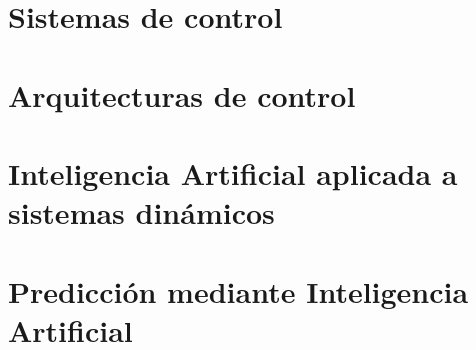 \documentclass[12pt,a4paper]{report}
\begin{document}
\section{Sistemas de control}

%
%
%


\section{Arquitecturas de control}

%
%
%


\section{Inteligencia Artificial aplicada a sistemas dinámicos}

%
%
%
%


\section{Predicción mediante Inteligencia Artificial}

%
%
%
%
%
%
\end{document}
